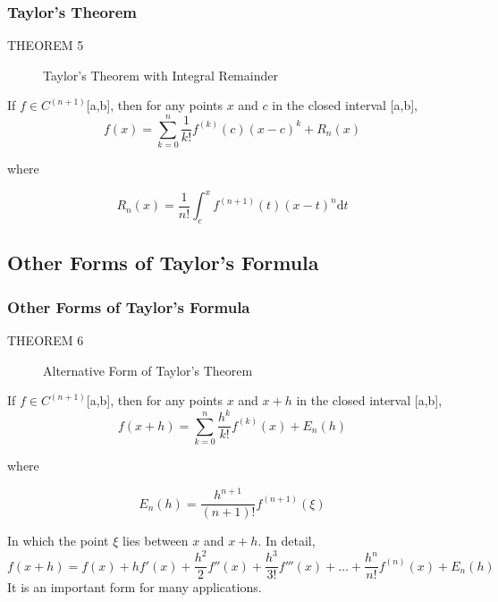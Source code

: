 \documentclass[notheorems,mathserif,table,compress]{beamer}  %
\begin{document}
\begin{frame}
\frametitle{Taylor's Theorem}
\begin{description}
\item[THEOREM 5] \textsf{Taylor's Theorem with Integral Remainder}
\end{description}
If $f \in C^{(n+1)}$[a,b], then for any points $x$ and $c$ in the closed interval [a,b],
\begin{displaymath}
f(x)=\sum_{k=0}^n\frac{1}{k!}f^{(k)}(c)(x-c)^k+R_n(x)
\end{displaymath}

where 
\newcommand{\ud}{\mathrm{d}}

\begin{displaymath}
R_n(x)=\frac{1}{n!}\int_{c}^{x}f^{(n+1)}(t)(x-t)^n \ud t
\end{displaymath}

\end{frame}

\subsection{Other Forms of Taylor's Formula}

\begin{frame}
\frametitle{Other Forms of Taylor's Formula}
\begin{description}
\item[THEOREM 6] \textsf{Alternative Form of Taylor's Theorem}
\end{description}
If $f \in C^{(n+1)}$[a,b], then for any points $x$ and $x+h$ in the closed interval [a,b],
\begin{displaymath}
f(x+h)=\sum_{k=0}^n\frac{h^k}{k!}f^{(k)}(x)+E_n(h)
\end{displaymath}

where 

\begin{displaymath}
E_n(h)=\frac{h^{n+1}}{(n+1)!} f^{(n+1)}(\xi)
\end{displaymath}

In which the point $\xi$ lies between $x$ and $x+h$. In detail,
\begin{displaymath}
f(x+h)=f(x)+hf'(x)+\frac{h^2}{2}f''(x)+\frac{h^3}{3!}f'''(x)+\ldots+\frac{h^n}{n!}f^{(n)}(x)+E_n(h)
\end{displaymath}
It is an important form for many applications.
\end{frame}
\end{document}
